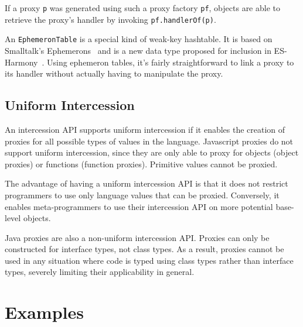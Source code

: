 \documentclass{acm_proc_article-sp}
\begin{document}
If a proxy \texttt{p} was generated using such a proxy factory \texttt{pf}, objects are able to retrieve the proxy's handler by invoking \texttt{pf.handlerOf(p)}.

An \texttt{EphemeronTable} is a special kind of weak-key hashtable. It is based on Smalltalk's Ephemerons~\cite{et_paper} and is a new data type proposed for inclusion in ES-Harmony~\cite{et_proposal}.
Using ephemeron tables, it's fairly straightforward to link a proxy to its handler without actually having to manipulate the proxy.

\subsection{Uniform Intercession}
\label{sub:uniform_intercession}

An intercession API supports uniform intercession if it enables the creation of proxies for all possible types of values in the language. Javascript proxies do not support uniform intercession, since they are only able to proxy for objects (object proxies) or functions (function proxies). Primitive values cannot be proxied.

The advantage of having a uniform intercession API is that it does not restrict programmers to use only language values that can be proxied. Conversely, it enables meta-programmers to use their intercession API on more potential base-level objects.

Java proxies are also a non-uniform intercession API. Proxies can only be constructed for interface types, not class types. As a result, proxies cannot be used in any situation where code is typed using class types rather than interface types, severely limiting their applicability in general.


\section{Examples}
\label{sec:examples}
\end{document}
